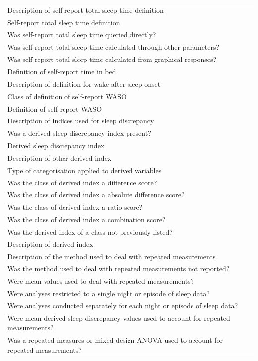 \documentclass[
]{article}
\begin{document}
\begin{longtable}[t]{l}
Description of self-report total sleep time definition\\
Self-report total sleep time definition\\
Was self-report total sleep time queried directly?\\
\addlinespace
Was self-report total sleep time calculated through other parameters?\\
Was self-report total sleep time calculated from graphical responses?\\
Definition of self-report time in bed\\
Description of definition for wake after sleep onset\\
Class of definition of self-report WASO\\
\addlinespace
Definition of self-report WASO\\
Description of indices used for sleep discrepancy\\
Was a derived sleep discrepancy index present?\\
Derived sleep discrepancy index\\
Description of other derived index\\
\addlinespace
Type of categorisation applied to derived variables\\
Was the class of derived index a difference score?\\
Was the class of derived index a absolute difference score?\\
Was the class of derived index a ratio score?\\
Was the class of derived index a combination score?\\
\addlinespace
Was the derived index of a class not previously listed?\\
Description of derived index\\
Description of the method used to deal with repeated measurements\\
Was the method used to deal with repeated measurements not reported?\\
Were mean values used to deal with repeated measurements?\\
\addlinespace
Were analyses restricted to a single night or episode of sleep data?\\
Were analyses conducted separately for each night or episode of sleep data?\\
Were mean derived sleep discrepancy values used to account for repeated measurements?\\
Was a repeated measures or mixed-design ANOVA used to account for repeated measurements?\\

\end{longtable}
\end{document}
